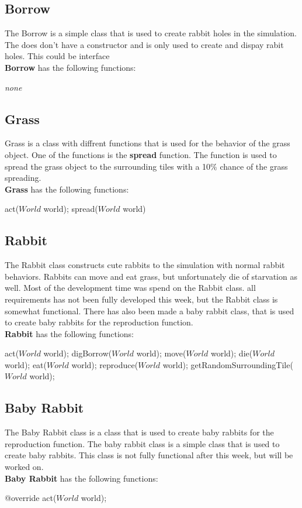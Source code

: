 \documentclass[11pt]{article}
\begin{document}
    \subsection*{Borrow}
    The Borrow is a simple class that is used to create rabbit holes in the simulation. The does don't have a constructor and is only used to create and dispay rabit holes. This could be interface 
    \\
    \textbf{Borrow} has the following functions:
    \begin{mdframed}
        \textit{none}
    \end{mdframed}
    \subsection*{Grass}
    Grass is a class with diffrent functions that is used for the behavior of the grass object. One of the functions is the \textbf{spread} function. The function is used to spread the grass object to the surrounding tiles with a 10$\%$ chance of the grass spreading. 
    \\
    \textbf{Grass} has the following functions:
    \begin{mdframed}
        act($World$ world); spread($World$ world)
    \end{mdframed}
    \newpage
    \subsection*{Rabbit}
    The Rabbit class constructs cute rabbits to the simulation with normal rabbit behaviors. Rabbits can move and eat grass, but unfortunately die of starvation as well. 
    Most of the development time was spend on the Rabbit class. all requirements has not been fully developed this week, but the Rabbit class is somewhat functional. 
    There has also been made a baby rabbit class, that is used to create baby rabbits for the reproduction function.
    \\
    \textbf{Rabbit} has the following functions:
    \begin{mdframed}
        act($World$ world); digBorrow($World$ world); move($World$ world); die($World$ world); eat($World$ world); reproduce($World$ world); getRandomSurroundingTile($World$ world); 
    \end{mdframed}
    \subsection*{Baby Rabbit}
    The Baby Rabbit class is a class that is used to create baby rabbits for the reproduction function. The baby rabbit class is a simple class that is used to create baby rabbits. This class is not fully functional after this week, but will be worked on.
    \\
    \textbf{Baby Rabbit} has the following functions:
    \begin{mdframed}
        @override act($World$ world); 
    \end{mdframed}
    \newpage
\end{document}
